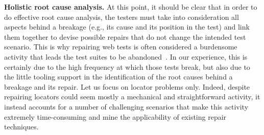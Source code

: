 \noindent
\textbf{Holistic root cause analysis.}
At this point, it should be clear that in order to do effective root cause analysis, the testers must take into consideration all aspects behind a breakage (e.g., its cause and its position in the test) and link them together to devise possible repairs that do not change the intended test scenario. This is why repairing web tests is often considered a burdensome activity that leads the test suites to be abandoned~\cite{Christophe2014}. In our experience, this is certainly due to the high frequency at which those tests break, but also due to the little tooling support in the identification of the root causes behind a breakage and its repair.
%
Let us focus on locator problems only. Indeed, despite repairing locators could seem mostly a mechanical and straightforward activity, it instead accounts for a number of challenging scenarios that make this activity extremely time-consuming and mine the applicability of existing repair techniques. 
